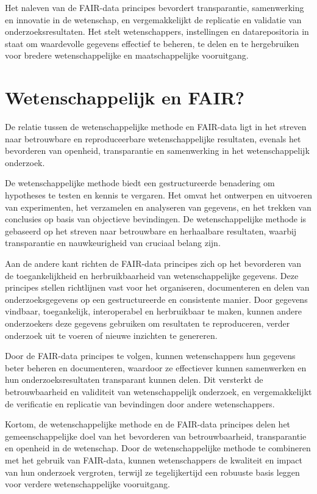\documentclass[
  letterpaper,
  DIV=11,
  numbers=noendperiod]{scrreprt}
\begin{document}
Het naleven van de FAIR-data principes bevordert transparantie,
samenwerking en innovatie in de wetenschap, en vergemakkelijkt de
replicatie en validatie van onderzoeksresultaten. Het stelt
wetenschappers, instellingen en datarepositoria in staat om waardevolle
gegevens effectief te beheren, te delen en te hergebruiken voor bredere
wetenschappelijke en maatschappelijke vooruitgang.

\hypertarget{wetenschappelijk-en-fair}{%
\section{Wetenschappelijk en FAIR?}\label{wetenschappelijk-en-fair}}

De relatie tussen de wetenschappelijke methode en FAIR-data ligt in het
streven naar betrouwbare en reproduceerbare wetenschappelijke
resultaten, evenals het bevorderen van openheid, transparantie en
samenwerking in het wetenschappelijk onderzoek.

De wetenschappelijke methode biedt een gestructureerde benadering om
hypotheses te testen en kennis te vergaren. Het omvat het ontwerpen en
uitvoeren van experimenten, het verzamelen en analyseren van gegevens,
en het trekken van conclusies op basis van objectieve bevindingen. De
wetenschappelijke methode is gebaseerd op het streven naar betrouwbare
en herhaalbare resultaten, waarbij transparantie en nauwkeurigheid van
cruciaal belang zijn.

Aan de andere kant richten de FAIR-data principes zich op het bevorderen
van de toegankelijkheid en herbruikbaarheid van wetenschappelijke
gegevens. Deze principes stellen richtlijnen vast voor het organiseren,
documenteren en delen van onderzoeksgegevens op een gestructureerde en
consistente manier. Door gegevens vindbaar, toegankelijk, interoperabel
en herbruikbaar te maken, kunnen andere onderzoekers deze gegevens
gebruiken om resultaten te reproduceren, verder onderzoek uit te voeren
of nieuwe inzichten te genereren.

Door de FAIR-data principes te volgen, kunnen wetenschappers hun
gegevens beter beheren en documenteren, waardoor ze effectiever kunnen
samenwerken en hun onderzoeksresultaten transparant kunnen delen. Dit
versterkt de betrouwbaarheid en validiteit van wetenschappelijk
onderzoek, en vergemakkelijkt de verificatie en replicatie van
bevindingen door andere wetenschappers.

Kortom, de wetenschappelijke methode en de FAIR-data principes delen het
gemeenschappelijke doel van het bevorderen van betrouwbaarheid,
transparantie en openheid in de wetenschap. Door de wetenschappelijke
methode te combineren met het gebruik van FAIR-data, kunnen
wetenschappers de kwaliteit en impact van hun onderzoek vergroten,
terwijl ze tegelijkertijd een robuuste basis leggen voor verdere
wetenschappelijke vooruitgang.
\end{document}
